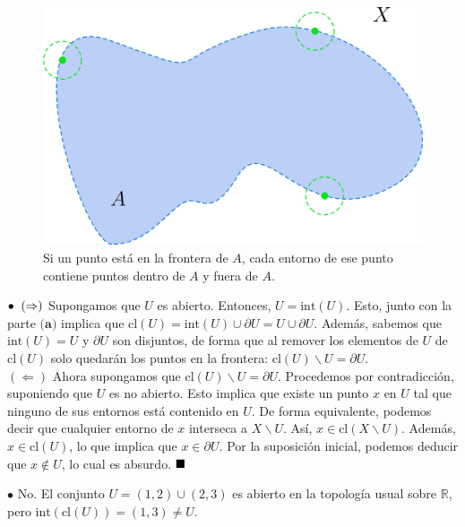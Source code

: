 \documentclass{article}
\begin{document}
\begin{figure}[h]
	\centering \includegraphics[scale=0.13]{e2fig2.png}
	\caption{Si un punto está en la frontera de $A$, cada entorno de ese punto contiene puntos dentro de $A$ y fuera de $A$. }
\end{figure}

$\bullet \hspace{0.2cm}  (\Rightarrow)$ Supongamos que $U$ es abierto. Entonces, $U = \text{int}(U)$. Esto, junto con la parte $\textbf{(a)}$ implica que $\text{cl}(U) = \text{int}(U) \cup \partial U = U \cup \partial U$.  Además, sabemos que $\text{int}(U) = U$ y $\partial U$ son disjuntos, de forma que al remover los elementos de $U$ de $\text{cl}(U)$ solo quedarán los puntos en la frontera: $\text{cl}(U) \backslash U = \partial U$. \\
$(\Leftarrow)$ Ahora supongamos que $\text{cl}(U) \backslash U = \partial U$. Procedemos por contradicción, suponiendo que $U$ es no abierto. Esto implica que existe un punto $x$ en $U$ tal que ninguno de sus entornos está contenido en $U$. De forma equivalente, podemos decir que cualquier entorno de $x$ interseca a $X \backslash U$. Así, $x \in \text{cl}(X \backslash U)$. Además, $x \in \text{cl}(U)$, lo que implica que $x \in \partial U$. Por la suposición inicial, podemos deducir que $x \notin U$, lo cual es absurdo. $\hspace*{\fill} \blacksquare$ \\

\newpage

$\bullet$ No. El conjunto $U = (1, 2) \cup (2, 3)$ es abierto en la topología usual sobre $\mathbb{R}$, pero $\text{int}(\text{cl}(U)) = (1, 3) \neq U.$\\
\end{document}
